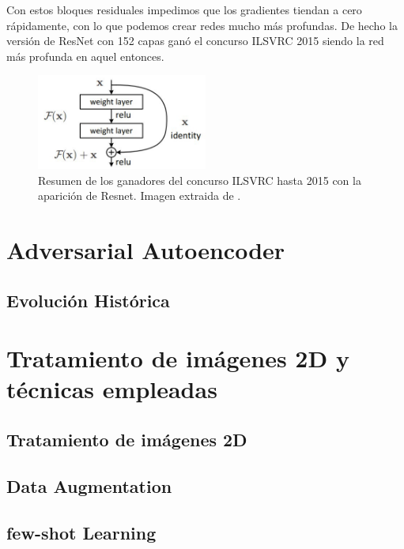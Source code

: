         \noindent Con estos bloques residuales impedimos que los gradientes tiendan a cero rápidamente, con lo que podemos crear redes mucho más profundas. De hecho la versión de ResNet con 152 capas ganó el concurso ILSVRC 2015 siendo la red más profunda en aquel entonces. 

        \begin{figure}[!h]
            \centering
            \includegraphics[width=0.5\textwidth]{img/resnet_module.jpeg}
            \caption{Resumen de los ganadores del concurso ILSVRC hasta 2015 con la aparición de Resnet. Imagen extraida de \cite{StanfordCourse}.}
            \label{fig:ImageNet}
        \end{figure}


\section{Adversarial Autoencoder}
    \subsection{Evolución Histórica}

\section{Tratamiento de imágenes 2D y técnicas empleadas}
    \subsection{Tratamiento de imágenes 2D}

    \subsection{Data Augmentation} \label{sub:data_augmentation}

    \subsection{few-shot Learning}

\endinput

